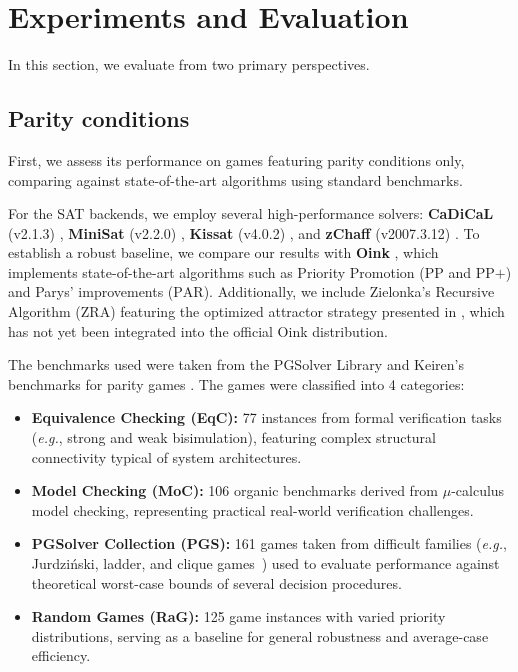 \documentclass[runningheads]{llncs}
\begin{document}

\section{Experiments and Evaluation}\label{sec:experiments}

In this section, we evaluate \nocq from two primary perspectives.

\subsection{Parity conditions}

First, we assess its performance on games featuring parity conditions only, comparing \nocq against state-of-the-art algorithms using standard benchmarks.

For the SAT backends, we employ several high-performance solvers: \textbf{CaDiCaL} (v2.1.3) \cite{Biere:Cadical:2024}, \textbf{MiniSat} (v2.2.0) \cite{Een:MiniSat:2003}, \textbf{Kissat} (v4.0.2) \cite{Biere:Kissat:2024}, and \textbf{zChaff} (v2007.3.12) \cite{Moskewicz:zChaff:2001}. To establish a robust baseline, we compare our results with \textbf{Oink} \cite{vanDijk:2018}, which implements state-of-the-art algorithms such as Priority Promotion ($\text{PP}$ and $\text{PP+}$) and Parys' improvements ($\text{PAR}$). Additionally, we include Zielonka's Recursive Algorithm ($\text{ZRA}$) featuring the optimized attractor strategy presented in \cite{Aggarwal:2023}, which has not yet been integrated into the official Oink distribution.

The benchmarks used were taken from the PGSolver Library \cite{Friedmann:2017} and Keiren's benchmarks for parity games \cite{Keiren:2015}. The games were classified into 4 categories:

\begin{itemize}
\item \textbf{Equivalence Checking (EqC):} 77 instances from formal verification tasks ({\em e.g.}, strong and weak bisimulation), featuring complex structural connectivity typical of system architectures.
\item \textbf{Model Checking (MoC):} 106 organic benchmarks derived from $\mu$-calculus model checking, representing practical real-world verification challenges.
\item \textbf{PGSolver Collection (PGS):} 161 games taken from difficult families ({\em e.g.}, Jurdziński, ladder, and clique games~\cite{Benerecetti:2016}) used to evaluate performance against theoretical worst-case bounds of several decision procedures.
\item \textbf{Random Games (RaG):} 125 game instances with varied priority distributions, serving as a baseline for general robustness and average-case efficiency.
\end{itemize}
\end{document}
